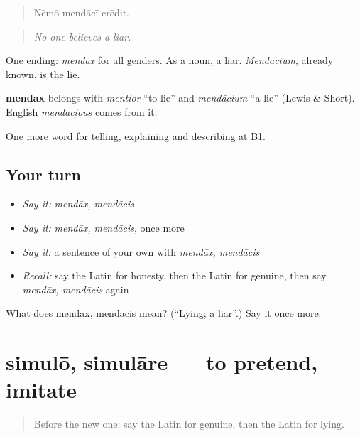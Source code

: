 \begin{quote}
Nēmō mendācī crēdit.
\end{quote}

\begin{quote}
\emph{No one believes a liar.}
\end{quote}

One ending: \emph{mendāx} for all genders. As a noun, a liar. \emph{Mendācium}, already known, is the lie.

\begin{cousinweb}
\textbf{mendāx} belongs with \emph{mentior} \textquotedblleft{}to lie\textquotedblright{} and \emph{mendācium} \textquotedblleft{}a lie\textquotedblright{} (Lewis \& Short). English \emph{mendacious} comes from it.
\end{cousinweb}

\begin{grammarlens}[title={What you've built}]
One more word for telling, explaining and describing at B1.
\end{grammarlens}

\subsection*{Your turn}
\begin{itemize}
\raggedright
  \item \emph{Say it:} \emph{mendāx, mendācis}
  \item \emph{Say it:} \emph{mendāx, mendācis}, once more
  \item \emph{Say it:} a sentence of your own with \emph{mendāx, mendācis}
  \item \emph{Recall:} say the Latin for honesty, then the Latin for genuine, then say \emph{mendāx, mendācis} again
\end{itemize}

\begin{tcolorbox}[breakable,colback=teal!4,colframe=teal!35!black,title={Before you move on}]
What does mendāx, mendācis mean? (\textquotedblleft{}Lying; a liar\textquotedblright{}.) Say it once more.
\end{tcolorbox}
\section[simulō, simulāre]{simulō, simulāre — to pretend, imitate}

\label{lesson:LA-C504-simulo}



\begin{quote}
Before the new one: say the Latin for genuine, then the Latin for lying.
\end{quote}

